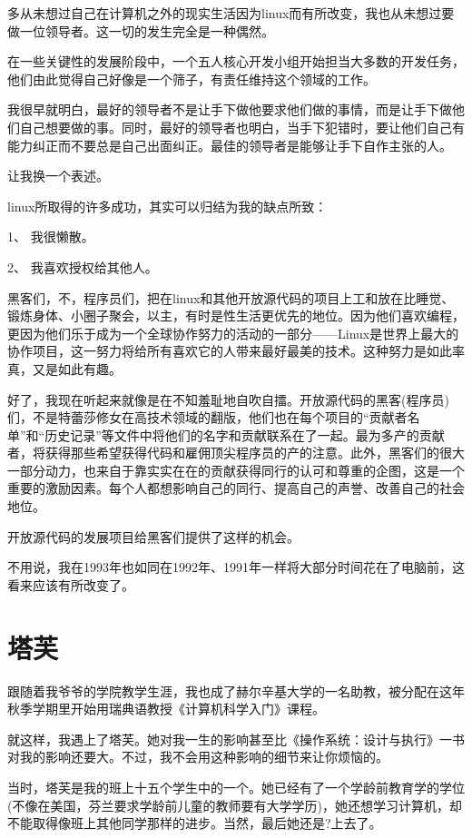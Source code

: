  

多从未想过自己在计算机之外的现实生活因为linux而有所改变，我也从未想过要做一位领导者。这一切的发生完全是一种偶然。

在一些关键性的发展阶段中，一个五人核心开发小组开始担当大多数的开发任务，他们由此觉得自己好像是一个筛子，有责任维持这个领域的工作。

我很早就明白，最好的领导者不是让手下做他要求他们做的事情，而是让手下做他们自己想要做的事。同时，最好的领导者也明白，当手下犯错时，要让他们自己有能力纠正而不要总是自己出面纠正。最佳的领导者是能够让手下自作主张的人。

让我换一个表述。

linux所取得的许多成功，其实可以归结为我的缺点所致：

1、 我很懒散。

2、 我喜欢授权给其他人。

黑客们，不，程序员们，把在linux和其他开放源代码的项目上工和放在比睡觉、锻炼身体、小圈子聚会，以主，有时是性生活更优先的地位。因为他们喜欢编程，更因为他们乐于成为一个全球协作努力的活动的一部分——Linux是世界上最大的协作项目，这一努力将给所有喜欢它的人带来最好最美的技术。这种努力是如此率真，又是如此有趣。

好了，我现在听起来就像是在不知羞耻地自吹自擂。开放源代码的黑客(程序员)们，不是特蕾莎修女在高技术领域的翻版，他们也在每个项目的“贡献者名单”和“历史记录”等文件中将他们的名字和贡献联系在了一起。最为多产的贡献者，将获得那些希望获得代码和雇佣顶尖程序员的产的注意。此外，黑客们的很大一部分动力，也来自于靠实实在在的贡献获得同行的认可和尊重的企图，这是一个重要的激励因素。每个人都想影响自己的同行、提高自己的声誉、改善自己的社会地位。

开放源代码的发展项目给黑客们提供了这样的机会。

不用说，我在1993年也如同在1992年、1991年一样将大部分时间花在了电脑前，这看来应该有所改变了。

 
\section{塔芙}

跟随着我爷爷的学院教学生涯，我也成了赫尔辛基大学的一名助教，被分配在这年秋季学期里开始用瑞典语教授《计算机科学入门》课程。

就这样，我遇上了塔芙。她对我一生的影响甚至比《操作系统：设计与执行》一书对我的影响还要大。不过，我不会用这种影响的细节来让你烦恼的。

当时，塔芙是我的班上十五个学生中的一个。她已经有了一个学龄前教育学的学位(不像在美国，芬兰要求学龄前儿童的教师要有大学学历)，她还想学习计算机，却不能取得像班上其他同学那样的进步。当然，最后她还是?上去了。

